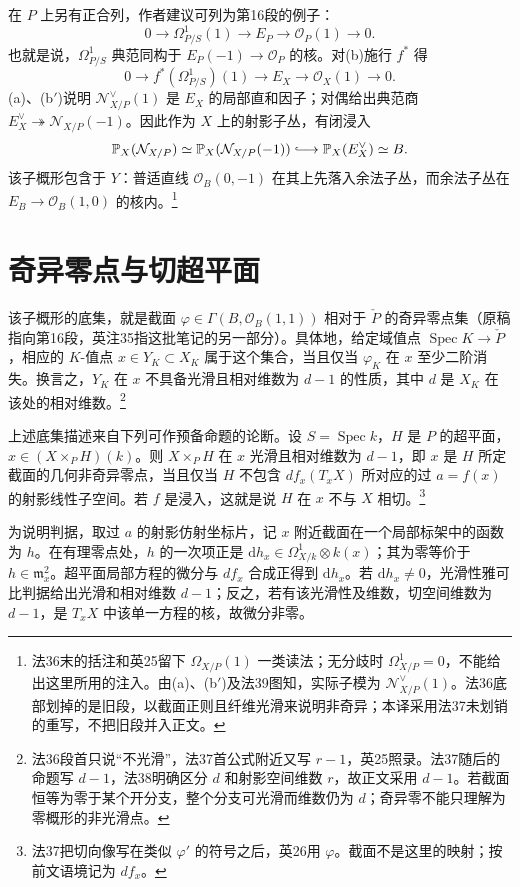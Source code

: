 \documentclass[openany,fontset=fandol]{ctexbook}
\newcommand{\PP}{\mathbb P}
\newcommand{\Ocal}{\mathcal O}
\newcommand{\N}{\mathcal N}
\newcommand{\Pdual}{\check P}
\begin{document}
在 $P$ 上另有正合列，作者建议可列为第16段的例子：
\begin{equation*}\tag{b}
0\longrightarrow\Omega^1_{P/S}(1)\longrightarrow E_P
 \longrightarrow\Ocal_P(1)\longrightarrow0.
\end{equation*}
也就是说，$\Omega^1_{P/S}$ 典范同构于 $E_P(-1)\to\Ocal_P$ 的核。对(b)施行 $f^*$ 得
\begin{equation*}\tag{b$'$}
0\longrightarrow f^*(\Omega^1_{P/S})(1)\longrightarrow E_X
 \longrightarrow\Ocal_X(1)\longrightarrow0.
\end{equation*}
(a)、(b$'$)说明 $\N^\vee_{X/P}(1)$ 是 $E_X$ 的局部直和因子；对偶给出典范商 $E_X^\vee\twoheadrightarrow\N_{X/P}(-1)$。因此作为 $X$ 上的射影子丛，有闭浸入
\[
 \PP_X(\N_{X/P})\simeq \PP_X(\N_{X/P}(-1))
 \lhook\joinrel\longrightarrow \PP_X(E_X^\vee)\simeq B.
\]
该子概形包含于 $Y$：普适直线 $\Ocal_B(0,-1)$ 在其上先落入余法子丛，而余法子丛在 $E_B\to\Ocal_B(1,0)$ 的核内。\footnote{法36末的括注和英25留下 $\Omega_{X/P}(1)$ 一类读法；无分歧时 $\Omega^1_{X/P}=0$，不能给出这里所用的注入。由(a)、(b$'$)及法39图知，实际子模为 $\N^\vee_{X/P}(1)$。法36底部划掉的是旧段，以截面正则且纤维光滑来说明非奇异；本译采用法37未划销的重写，不把旧段并入正文。}

\newpage
\section*{奇异零点与切超平面}
该子概形的底集，就是截面
$\varphi\in\Gamma(B,\Ocal_B(1,1))$ 相对于 $\Pdual$ 的奇异零点集（原稿指向第16段，英注35指这批笔记的另一部分）。具体地，给定域值点 $\operatorname{Spec}K\to\Pdual$，相应的 $K$-值点 $x\in Y_K\subset X_K$ 属于这个集合，当且仅当 $\varphi_K$ 在 $x$ 至少二阶消失。换言之，$Y_K$ 在 $x$ 不具备光滑且相对维数为 $d-1$ 的性质，其中 $d$ 是 $X_K$ 在该处的相对维数。\footnote{法36段首只说“不光滑”，法37首公式附近又写 $r-1$，英25照录。法37随后的命题写 $d-1$，法38明确区分 $d$ 和射影空间维数 $r$，故正文采用 $d-1$。若截面恒等为零于某个开分支，整个分支可光滑而维数仍为 $d$；奇异零不能只理解为零概形的非光滑点。}

上述底集描述来自下列可作预备命题的论断。设 $S=\operatorname{Spec}k$，$H$ 是 $P$ 的超平面，$x\in (X\times_P H)(k)$。则 $X\times_P H$ 在 $x$ 光滑且相对维数为 $d-1$，即 $x$ 是 $H$ 所定截面的几何非奇异零点，当且仅当 $H$ 不包含 $df_x(T_xX)$ 所对应的过 $a=f(x)$ 的射影线性子空间。若 $f$ 是浸入，这就是说 $H$ 在 $x$ 不与 $X$ 相切。\footnote{法37把切向像写在类似 $\varphi'$ 的符号之后，英26用 $\varphi$。截面不是这里的映射；按前文语境记为 $df_x$。}

为说明判据，取过 $a$ 的射影仿射坐标片，记 $x$ 附近截面在一个局部标架中的函数为 $h$。在有理零点处，$h$ 的一次项正是 $\mathrm dh_x\in\Omega^1_{X/k}\otimes k(x)$；其为零等价于 $h\in\mathfrak m_x^2$。超平面局部方程的微分与 $df_x$ 合成正得到 $\mathrm dh_x$。若 $\mathrm dh_x\ne0$，光滑性雅可比判据给出光滑和相对维数 $d-1$；反之，若有该光滑性及维数，切空间维数为 $d-1$，是 $T_xX$ 中该单一方程的核，故微分非零。
\end{document}
